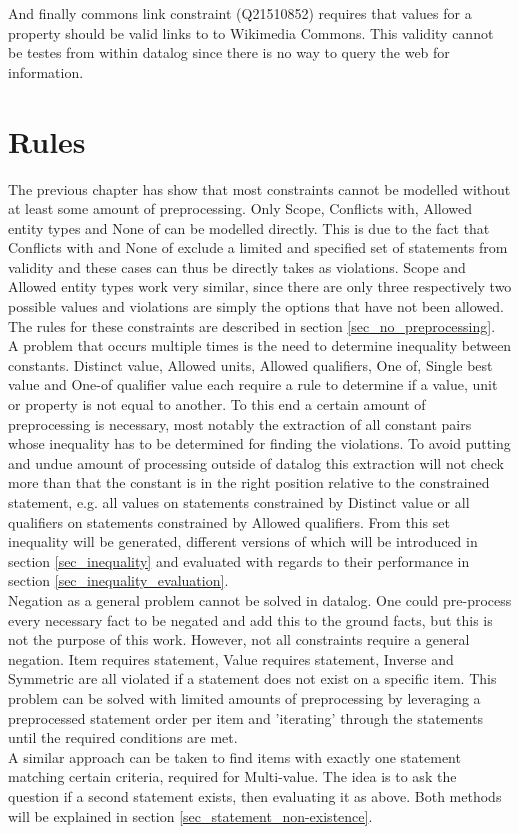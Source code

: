 \documentclass[hyperref,bachelorofscience,fleqn]{cgvpub}
\begin{document}
And finally commons link constraint (Q21510852) requires that values for a property should be valid links to to Wikimedia Commons. This validity cannot be testes from within datalog since there is no way to query the web for information.


\chapter{Rules}\label{cha_rules}
The previous chapter has show that most constraints cannot be modelled without at least some amount of preprocessing. Only Scope, Conflicts with, Allowed entity types and None of can be modelled directly. This is due to the fact that Conflicts with and None of exclude a limited and specified set of statements from validity and these cases can thus be directly takes as violations. Scope and Allowed entity types work very similar, since there are only three respectively two possible values and violations are simply the options that have not been allowed.  The rules for these constraints are described in section \ref{sec_no_preprocessing}.\\

A problem that occurs multiple times is the need to determine inequality between constants. Distinct value, Allowed units, Allowed qualifiers, One of, Single best value and One-of qualifier value each require a rule to determine if a value, unit or property is not equal to another. To this end a certain amount of preprocessing is necessary, most notably the extraction of all constant pairs whose inequality has to be determined for finding the violations. To avoid putting and undue amount of processing outside of datalog this extraction will not check more than that the constant is in the right position relative to the constrained statement, e.g. all values on statements constrained by Distinct value or all qualifiers on statements constrained by Allowed qualifiers. From this set inequality will be generated, different versions of which will be introduced in section \ref{sec_inequality} and evaluated with regards to their performance in section \ref{sec_inequality_evaluation}.\\

Negation as a general problem cannot be solved in datalog. One could pre-process every necessary fact to be negated and add this to the ground facts, but this is not the purpose of this work. However, not all constraints require a general negation. Item requires statement, Value requires statement, Inverse and Symmetric are all violated if a statement does not exist on a specific item. This problem can be solved with limited amounts of preprocessing by leveraging a preprocessed statement order per item and 'iterating' through the statements until the required conditions are met.\\
A similar approach can be taken to find items with exactly one statement matching certain criteria, required for 	Multi-value. The idea is to ask the question if a second statement exists, then evaluating it as above. Both methods will be explained in section \ref{sec_statement_non-existence}.
\end{document}
